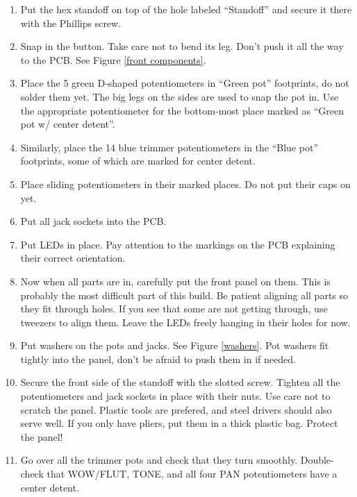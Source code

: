 \documentclass[10pt,a4paper,twocolumn]{article}
\begin{document}
\begin{enumerate}
  \item Put the hex standoff on top of the hole labeled ``Standoff'' and secure
    it there with the Phillips screw.
  \item Snap in the button. Take care not to bend its leg. Don't push it all the
    way to the PCB. See Figure \ref{front components}.
  \item Place the 5 green D-shaped potentiometers in ``Green pot''
    footprints, do not solder them yet. The big legs on the sides are used to
    snap the pot in. Use the appropriate potentiometer for the bottom-most
    place marked as ``Green pot w/ center detent''.
  \item Similarly, place the 14 blue trimmer potentiometers in the ``Blue pot''
    footprints, some of which are marked for center detent.
  \item Place sliding potentiometers in their marked places. Do not put their
    caps on yet.
  \item Put all jack sockets into the PCB.
  \item Put LEDs in place. Pay attention to the markings on the PCB explaining
    their correct orientation.
  \item Now when all parts are in, carefully put the front panel on them.
    This is probably the most difficult part of this build. Be patient aligning
    all parts so they fit through holes. If you see that some are not getting
    through, use tweezers to align them. Leave the LEDs freely hanging in their
    holes for now.
  \item Put washers on the pots and jacks. See Figure \ref{washers}. Pot washers
    fit tightly into the panel, don't be afraid to push them in if needed.
  \item Secure the front side of the standoff with the slotted screw. Tighten
    all the potentiometers and jack sockets in place with their nuts.
    Use care not to scratch the panel. Plastic tools are prefered,
    and steel drivers should also serve well. If you only have pliers, put them
    in a thick plastic bag. Protect the panel!
  \item Go over all the trimmer pots and check that they turn smoothly.
    Double-check that WOW/FLUT, TONE, and all four PAN potentiometers have a
    center detent.
\end{enumerate}
\end{document}
